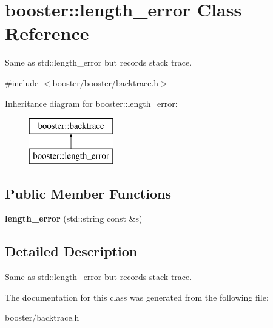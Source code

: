 \section{booster\-:\-:length\-\_\-error \-Class \-Reference}
\label{classbooster_1_1length__error}


\-Same as std\-::length\-\_\-error but records stack trace.  




{\ttfamily \#include $<$booster/booster/backtrace.\-h$>$}

\-Inheritance diagram for booster\-:\-:length\-\_\-error\-:\begin{figure}[H]
\begin{center}
\leavevmode
\includegraphics[height=2.000000cm]{classbooster_1_1length__error}
\end{center}
\end{figure}
\subsection*{\-Public \-Member \-Functions}
\begin{DoxyCompactItemize}
\item 
{\bfseries length\-\_\-error} (std\-::string const \&s)\label{classbooster_1_1length__error_a38d9c01105d54f14c960a8f6fd04b893}

\end{DoxyCompactItemize}


\subsection{\-Detailed \-Description}
\-Same as std\-::length\-\_\-error but records stack trace. 

\-The documentation for this class was generated from the following file\-:\begin{DoxyCompactItemize}
\item 
booster/backtrace.\-h\end{DoxyCompactItemize}
